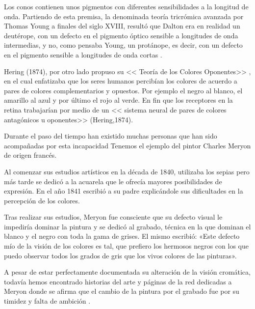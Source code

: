 \documentclass[10pt]{article}
\begin{document}
\setlength{\parskip}{2mm}

Los conos contienen unos pigmentos con diferentes sensibilidades a la longitud de onda. Partiendo de esta premisa, la denominada teoría tricrómica avanzada por Thomas Young a finales del siglo XVIII, resultó que Dalton era en realidad un deutérope, con un defecto en el pigmento óptico sensible a longitudes de onda intermedias, y no, como pensaba Young, un protánope, es decir, con un defecto en el pigmento sensible a longitudes de onda cortas \cite{IEEEreferencias:Ref3}.

\setlength{\parskip}{2mm}

Hering (1874), por otro lado propuso su << Teoría de los Colores Oponentes>> , en el cual enfatizaba que los seres humanos percibían los colores de acuerdo a pares de colores complementarios y opuestos. Por ejemplo el negro al blanco, el amarillo al azul y por último el rojo al verde. En fin que los receptores en la retina trabajarían por medio de un << sistema neural de pares de colores antagónicos u oponentes>> (Hering,1874)\cite{IEEEreferencias:Ref4}.

\setlength{\parskip}{2mm}

Durante el paso del tiempo han existido muchas personas que han sido acompañadas por esta incapacidad 
Tenemos el ejemplo del pintor Charles Meryon de origen francés\cite{IEEEreferencias:Ref5}.

\setlength{\parskip}{2mm}

Al comenzar sus estudios artísticos en la década de 1840, utilizaba los sepias pero más tarde se dedicó a la acuarela que le ofrecía mayores posibilidades de expresión. En el año 1841 escribió a su padre explicándole sus dificultades en la percepción de los colores\cite{IEEEreferencias:Ref5}.
\setlength{\parskip}{2mm}

Tras realizar sus estudios, Meryon fue consciente que su defecto visual le impediría dominar la pintura y se dedicó al grabado, técnica en la que dominan el blanco y el negro con toda la gama de grises. El mismo escribió: «Este defecto mío de la visión de los colores es tal, que prefiero los hermosos negros con los que puedo observar todos los grados de gris que los vivos colores de las pinturas»\cite{IEEEreferencias:Ref5}.

\setlength{\parskip}{2mm}

A pesar de estar perfectamente documentada su alteración de la visión cromática, todavía hemos encontrado historias del arte y páginas de la red dedicadas a Meryon donde se afirma que el cambio de la pintura por el grabado fue por su timidez y falta de ambición \cite{IEEEreferencias:Ref5}.
\end{document}
